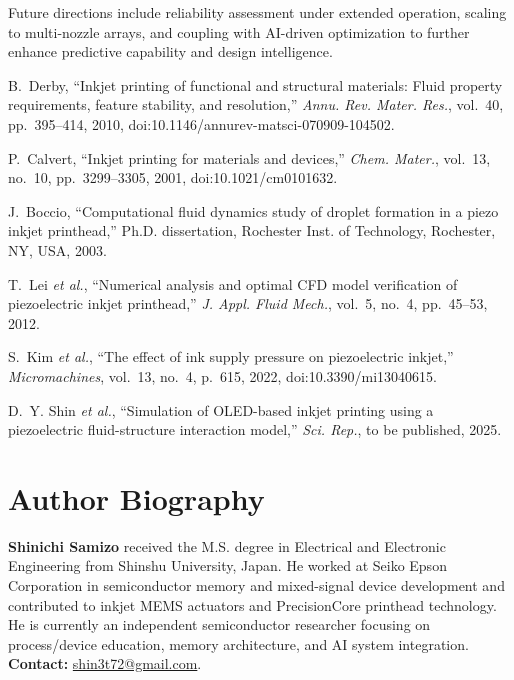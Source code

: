 \documentclass[conference]{IEEEtran}
\begin{document}
Future directions include reliability assessment under extended operation, scaling to multi-nozzle arrays, and coupling with AI-driven optimization to further enhance predictive capability and design intelligence.

\begin{thebibliography}{99}

B.~Derby, ``Inkjet printing of functional and structural materials: Fluid property requirements, feature stability, and resolution,'' 
\emph{Annu. Rev. Mater. Res.}, vol.~40, pp.~395--414, 2010, doi:10.1146/annurev-matsci-070909-104502.

P.~Calvert, ``Inkjet printing for materials and devices,'' 
\emph{Chem. Mater.}, vol.~13, no.~10, pp.~3299--3305, 2001, doi:10.1021/cm0101632.

J.~Boccio, ``Computational fluid dynamics study of droplet formation in a piezo inkjet printhead,'' 
Ph.D. dissertation, Rochester Inst. of Technology, Rochester, NY, USA, 2003.

T.~Lei \emph{et al.}, ``Numerical analysis and optimal CFD model verification of piezoelectric inkjet printhead,'' 
\emph{J. Appl. Fluid Mech.}, vol.~5, no.~4, pp.~45--53, 2012.

S.~Kim \emph{et al.}, ``The effect of ink supply pressure on piezoelectric inkjet,'' 
\emph{Micromachines}, vol.~13, no.~4, p.~615, 2022, doi:10.3390/mi13040615.

D.~Y. Shin \emph{et al.}, ``Simulation of OLED-based inkjet printing using a piezoelectric fluid-structure interaction model,'' 
\emph{Sci. Rep.}, to be published, 2025.

\end{thebibliography}

\section*{Author Biography}
\textbf{Shinichi Samizo} received the M.S. degree in Electrical and Electronic Engineering from Shinshu University, Japan. He worked at Seiko Epson Corporation in semiconductor memory and mixed-signal device development and contributed to inkjet MEMS actuators and PrecisionCore printhead technology. He is currently an independent semiconductor researcher focusing on process/device education, memory architecture, and AI system integration. \textbf{Contact:} \href{mailto:shin3t72@gmail.com}{shin3t72@gmail.com}.
\end{document}
